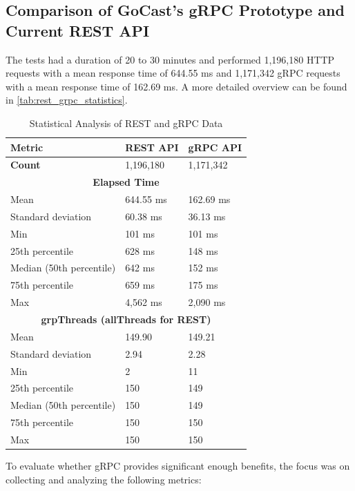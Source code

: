 \subsection{Comparison of GoCast's gRPC Prototype and Current REST API}
The tests had a duration of 20 to 30 minutes and performed 1,196,180 HTTP requests with a mean response time of 644.55 ms and 1,171,342 \ac{gRPC} requests with a mean response time of 162.69 ms. A more detailed overview can be found in \autoref{tab:rest_grpc_statistics}.

\begin{table}[htbp]
\centering
\caption{Statistical Analysis of \ac{REST} and \ac{gRPC} Data}
\label{tab:rest_grpc_statistics}
\begin{tabular}{|l|l|l|}
\hline
\textbf{Metric} & \textbf{\ac{REST} \ac{API}} & \textbf{\ac{gRPC} \ac{API}} \\ \hline
\textbf{Count} & 1,196,180 & 1,171,342 \\ \hline
\multicolumn{3}{|c|}{\textbf{Elapsed Time}} \\ \hline
Mean & 644.55 ms & 162.69 ms \\ \hline
Standard deviation & 60.38 ms & 36.13 ms \\ \hline
Min & 101 ms & 101 ms \\ \hline
25th percentile & 628 ms & 148 ms \\ \hline
Median (50th percentile) & 642 ms & 152 ms \\ \hline
75th percentile & 659 ms & 175 ms \\ \hline
Max & 4,562 ms & 2,090 ms \\ \hline
\multicolumn{3}{|c|}{\textbf{grpThreads (allThreads for \ac{REST})}} \\ \hline
Mean & 149.90 & 149.21 \\ \hline
Standard deviation & 2.94 & 2.28 \\ \hline
Min & 2 & 11 \\ \hline
25th percentile & 150 & 149 \\ \hline
Median (50th percentile) & 150 & 149 \\ \hline
75th percentile & 150 & 150 \\ \hline
Max & 150 & 150 \\ \hline
\end{tabular}
\end{table}

\noindent To evaluate whether \ac{gRPC} provides significant enough benefits, the focus was on collecting and analyzing the following metrics:

